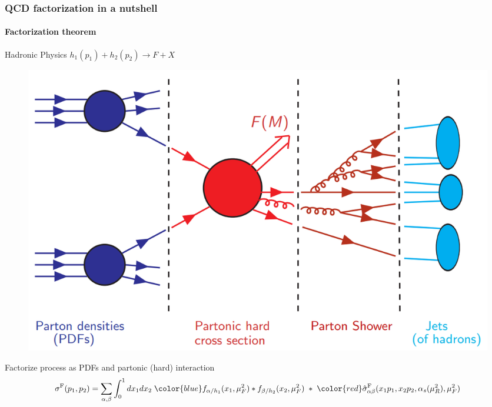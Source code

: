 \documentclass[aspectratio=43]{beamer}
\begin{document}
\begin{frame}

	\frametitle{QCD factorization in a nutshell}
	\framesubtitle{Factorization theorem}

	\center \textrm{Hadronic Physics} \footnotesize $h_{1}(p_{1}) + h_{2}(p_{2}) \rightarrow F + X$ 
	
	\begin{figure}
		\includegraphics[width = 7 cm]{plots/section1/factorization_1.png}
	\end{figure}
	
	\center \footnotesize {Factorize process as {\color{blue}PDFs} and {\color{red} partonic (hard) interaction}	
	\begin{equation}
		\sigma^{\textrm{F}}(p_{1}, p_{2}) = \sum_{\alpha, \beta}
		\int_{0}^{1} dx_{1} dx_{2} \; {\color{blue} f_{\alpha/h_{1}}(x_{1}, \mu_{F}^{2}) \ast f_{\beta/h_{2}}(x_{2}, \mu_{F}^{2})}
		\; \ast \;  
		{\color{red}\hat{\sigma}^{\textrm{F}}_{\alpha \beta}(x_{1}p_{1}, x_{2}p_{2}, \alpha_{s}(\mu_{R}^{2}), \mu_{F}^{2})} \nonumber
	\end{equation}}
\end{frame}

\begin{frame}


\end{frame}
\end{document}
